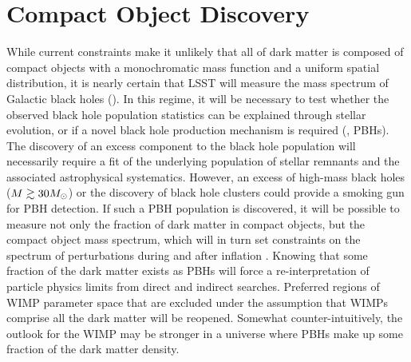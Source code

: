 \section{Compact Object Discovery}
\label{sec:pbh_discovery}

While current constraints make it unlikely that all of dark matter is composed of compact objects with a monochromatic mass function and a uniform spatial distribution, it is nearly certain that LSST will measure the mass spectrum of Galactic black holes ().
In this regime, it will be necessary to test whether the observed black hole population statistics can be explained through stellar evolution, or if a novel black hole production mechanism is required (\ie, PBHs).
The discovery of an excess component to the black hole population will necessarily require a fit of the underlying population of stellar remnants and the associated astrophysical systematics. 
However, an excess of high-mass black holes ($M \gtrsim 30M_\odot$) or the discovery of black hole clusters \citep[\eg,][]{Clesse:2016} could provide a smoking gun for PBH detection.
If such a PBH population is discovered, it will be possible to measure not only the fraction of dark matter in compact objects, but the compact object mass spectrum, which will in turn set constraints on the spectrum of perturbations during and after inflation \citep[\eg,][]{1702.03901}.
Knowing that some fraction of the dark matter exists as PBHs will force a re-interpretation of particle physics limits from direct and indirect searches.
Preferred regions of WIMP parameter space that are excluded under the assumption that WIMPs comprise all the dark matter will be reopened.
Somewhat counter-intuitively, the outlook for the WIMP may be stronger in a universe where PBHs make up some fraction of the dark matter density.

